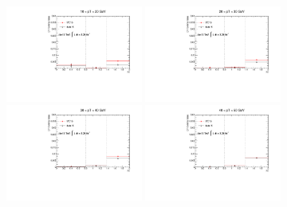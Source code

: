 \begin{figure}[h!]
\centering
\includegraphics[width=0.4\textwidth]{FIGURES/BKG/chargeFlip/CFrates___dataVSmc___PTbin0.pdf}
\includegraphics[width=0.4\textwidth]{FIGURES/BKG/chargeFlip/CFrates___dataVSmc___PTbin1.pdf}
\vfill
\includegraphics[width=0.4\textwidth]{FIGURES/BKG/chargeFlip/CFrates___dataVSmc___PTbin2.pdf}
\includegraphics[width=0.4\textwidth]{FIGURES/BKG/chargeFlip/CFrates___dataVSmc___PTbin3.pdf}


\end{figure}
